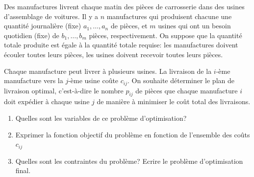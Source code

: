 Des manufactures livrent chaque matin des pièces de carrosserie dans des usines d'assemblage de voitures. Il y a $n$ manufactures qui produisent chacune une quantité journalière (fixe) $a_1, \ldots, a_n$ de pièces, et $m$ usines qui ont un besoin quotidien (fixe) de $b_1, \ldots, b_m$ pièces, respectivement. On suppose que la quantité totale produite est égale à la quantité totale requise: les manufactures doivent écouler toutes leurs pièces, les usines doivent recevoir toutes leurs pièces.

Chaque manufacture peut livrer à plusieurs usines. La livraison de la $i$-ème manufacture vers la $j$-ème usine coûte $c_{ij}$. On souhaite déterminer le plan de livraison optimal, c'est-à-dire le nombre $p_{ij}$ de pièces que chaque manufacture $i$ doit expédier à chaque usine $j$ de manière à minimiser le coût total des livraisons.

\begin{enumerate}
	\item Quelles sont les variables de ce problème d'optimisation?
	\item Exprimer la fonction objectif du problème en fonction de l'ensemble des coûts $c_{ij}$
	\item Quelles sont les contraintes du problème? Ecrire le problème d'optimisation final.
\end{enumerate}

